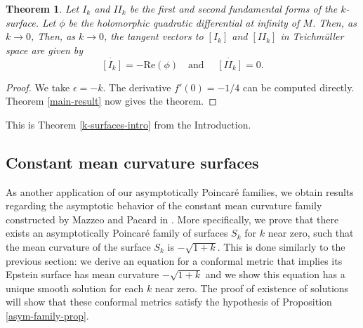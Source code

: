 \documentclass{amsart}
\newtheorem{thm}{Theorem}[section]
\newcommand{\two}{I\!\!I}
\begin{document}
\begin{thm} \label{labourie-conjecture-proof}
Let $I_k$ and $\two_k$ be the first and second fundamental forms of the $k$-surface. 
Let $\phi$ be the holomorphic quadratic differential at infinity of $M$. 
Then, as $k \to 0$, Then, as $k \to 0$, the tangent vectors to $[I_k]$ and $[\two_k]$ in Teichm\"uller space are given by 
\[
\dot{[I_k]} = - \mathrm{Re}(\phi) \quad \text{and } \quad   \dot{[\two_k]} = 0.
\]
\end{thm}

\begin{proof}
We take $\epsilon = -k$. 
The derivative $f'(0) = -1/4$ can be computed directly. 
Theorem \ref{main-result} now gives the theorem.
\end{proof}
This is Theorem \ref{k-surfaces-intro} from the Introduction.


\subsection{Constant mean curvature surfaces}



As another application of our asymptotically Poincar\'e families, we obtain results regarding the asymptotic behavior of the constant mean curvature family constructed by Mazzeo and Pacard in \cite{mazzeo-pacard2011}. 
More specifically, we prove that there exists an asymptotically Poincar\'e family of surfaces $S_k$ for $k$ near zero, such that the mean curvature of the surface $S_k$ is $-\sqrt{1+k}$. 
This is done similarly to the previous section: we derive an equation for a conformal metric that implies its Epstein surface has mean curvature $-\sqrt{1+k}$ and we show this equation has a unique smooth solution for each $k$ near zero. 
The proof of existence of solutions will show that these conformal metrics satisfy the hypothesis of Proposition \ref{asym-family-prop}.
\end{document}
